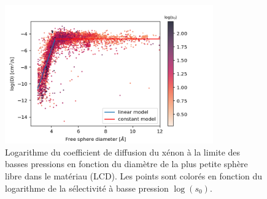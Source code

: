 \documentclass[main]{subfiles}
\begin{document}

\begin{figure}[t]
\centering
  \includegraphics[width=0.8\textwidth]{figures/5-diffusion/D_log-diameter_colored_s_models+.png}
  \caption{Logarithme du coefficient de diffusion du xénon à la limite des basses pressions en fonction du diamètre de la plus petite sphère libre dans le matériau (LCD). Les points sont colorés en fonction du logarithme de la sélectivité à basse pression $\log(s_0)$.}\label{fgr:Diff_Df_s}
\end{figure}
\end{document}
